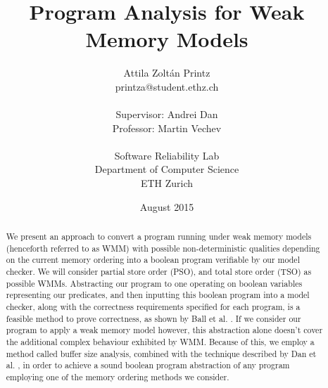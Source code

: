 \documentclass{article}
\begin{document}
\title{Program Analysis for Weak Memory Models}

\author
{
	Attila Zolt\'an Printz \\
	printza@student.ethz.ch \\
	\\
	Supervisor: Andrei Dan \\
	Professor: Martin Vechev \\
	\\
	Software Reliability Lab \\
	Department of Computer Science \\
	ETH Zurich
}

\date{August 2015}
\maketitle

\begin{abstract}

	We present an approach to convert a program running under weak memory models (henceforth referred to as WMM) with possible non-deterministic qualities depending on the current memory ordering into a boolean program verifiable by our model checker. We will consider partial store order (PSO), and total store order (TSO) as possible WMMs. Abstracting our program to one operating on boolean variables representing our predicates, and then inputting this boolean program into a model checker, along with the correctness requirements specified for each program, is a feasible method to prove correctness, as shown by Ball et al. \cite{balletal01}. If we consider our program to apply a weak memory model however, this abstraction alone doesn't cover the additional complex behaviour exhibited by WMM. Because of this, we employ a method called buffer size analysis, combined with the technique described by Dan et al. \cite{danetal13}, in order to achieve a sound boolean program abstraction of any program employing one of the memory ordering methods we consider.

\end{abstract}















\pagebreak
\end{document}
